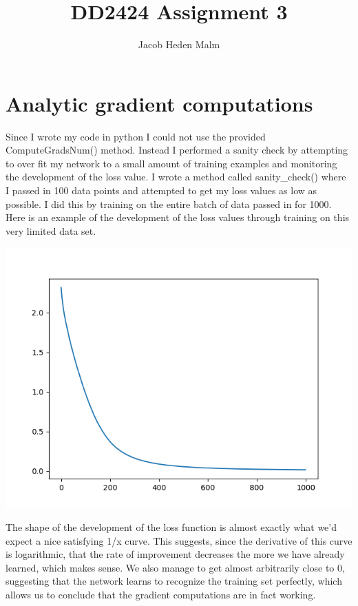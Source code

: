 \documentclass[11pt,a4paper]{article}
\author{Jacob Heden Malm}
\title{DD2424 Assignment 3}
\begin{document}
\maketitle

\section{Analytic gradient computations}

Since I wrote my code in python I could not use the provided ComputeGradsNum() method. Instead I performed a sanity check by attempting to over fit my network to a small amount of training examples and monitoring the development of the loss value. I wrote a method called sanity\_check() where I passed in 100 data points and attempted to get my loss values as low as possible. I did this by training on the entire batch of data passed in for 1000.\\

Here is an example of the development of the loss values through training on this very limited data set.

\includegraphics[width=\textwidth]{sanity_check.png}


The shape of the development of the loss function is almost exactly what we'd expect a nice satisfying 1/x curve. This suggests, since the derivative of this curve is logarithmic, that the rate of improvement decreases the more we have already learned, which makes sense. We also manage to get almost arbitrarily close to 0, suggesting that the network learns to recognize the training set perfectly, which allows us to conclude that the gradient computations are in fact working.
\end{document}
